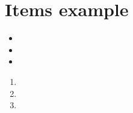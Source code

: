 \section{Items example}\label{sec:item}

\begin{itemize}
\item
\item
\item
\end{itemize}

\begin{enumerate}
\item
\item
\item
\end{enumerate}
